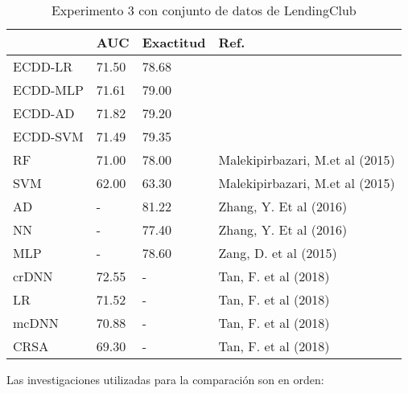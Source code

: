 \begin{table}[]
\centering
\caption{Experimento 3 con conjunto de datos de LendingClub}
\label{tab:lc-proc3}
\begin{tabularx}{\textwidth}{|l|Y Y l|}
				\hline
				& AUC			& Exactitud		& Ref.									\\
				\hline
ECDD-LR			& 71.50			& 78.68			&										\\		%
ECDD-MLP		& 71.61			& 79.00			&										\\		%
ECDD-AD			& 71.82			& 79.20			&										\\		%
ECDD-SVM		& 71.49			& 79.35			&										\\		%
				\hline
RF				& 71.00			& 78.00			& Malekipirbazari, M.et al (2015)		\\		%
SVM				& 62.00			& 63.30			& Malekipirbazari, M.et al (2015)		\\		%
AD				& -				& 81.22			& Zhang, Y. Et al (2016)				\\		%
NN				& -				& 77.40			& Zhang, Y. Et al (2016)				\\		%
MLP				& -				& 78.60			& Zang, D. et al (2015)					\\		%
crDNN			& 72.55			& -				& Tan, F. et al (2018)					\\		%
LR				& 71.52			& -				& Tan, F. et al (2018)					\\		%
mcDNN			& 70.88			& -				& Tan, F. et al (2018)					\\		%
CRSA			& 69.30			& -				& Tan, F. et al (2018)					\\		%
				\hline
\end{tabularx}
\par
\small
Las investigaciones utilizadas para la comparación son en orden: \citep{malekipirbazari2015risk, zhang2016research, zang2014credit, tan2018deep}
\end{table}


